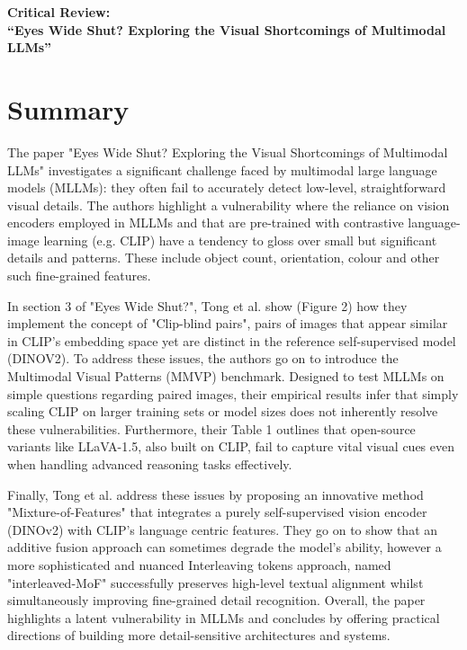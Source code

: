 \documentclass[11pt]{article}
\begin{document}
\thispagestyle{fancy}

\begin{center}
    {\large \textbf{Critical Review:}\\
    \textbf{``Eyes Wide Shut? Exploring the Visual Shortcomings of Multimodal LLMs''}}
\end{center}

\section*{Summary}

The paper "Eyes Wide Shut? Exploring the Visual Shortcomings of Multimodal LLMs" \cite{Tong2024CVPR} investigates a significant challenge faced by multimodal large language models (MLLMs): they often fail to accurately detect low-level, straightforward visual details.
The authors highlight a vulnerability where the reliance on vision encoders employed in MLLMs and that are pre-trained with contrastive language-image learning (e.g. CLIP) have a tendency to gloss over small but significant details and patterns. These include object count, orientation, colour and other such fine-grained features.

In section 3 of "Eyes Wide Shut?", Tong et al. show (Figure 2) how they implement the concept of "Clip-blind pairs", pairs of images that appear similar in CLIP's embedding space yet are distinct in the reference self-supervised model (DINOV2).
To address these issues, the authors go on to introduce the Multimodal Visual Patterns (MMVP) benchmark. Designed to test MLLMs on simple questions regarding paired images, their empirical results infer that simply scaling CLIP on larger training sets or model sizes does not inherently resolve these vulnerabilities.
Furthermore, their Table 1 outlines that open-source variants like LLaVA-1.5, also built on CLIP, fail to capture vital visual cues even when handling advanced reasoning tasks effectively.

Finally, Tong et al. address these issues by proposing an innovative method "Mixture-of-Features" that integrates a purely self-supervised vision encoder (DINOv2) with CLIP's language centric features. They go on to show that an additive fusion approach can sometimes degrade the model's ability, however a more sophisticated and nuanced
Interleaving tokens approach, named "interleaved-MoF" successfully preserves high-level textual alignment whilst simultaneously improving fine-grained detail recognition. Overall, the paper highlights a latent vulnerability in MLLMs and concludes by offering practical directions of building more detail-sensitive architectures and systems.
\end{document}
